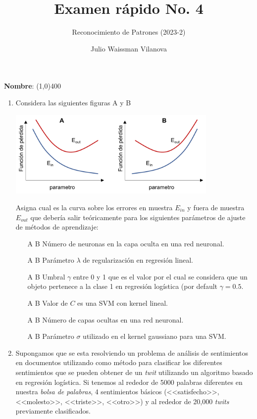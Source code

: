 \documentclass[11pt]{article}
\title{Examen rápido No. 4}
\author{Reconocimiento de Patrones (2023-2)}
\date{Julio Waissman Vilanova} %
\begin{document}
\maketitle

\vspace{5mm}

\textbf{Nombre}: \line(1,0){400}

\vspace{9mm}


\begin{enumerate}



\item Considera las siguientes figuras A y B

\begin{center}
  \includegraphics[width = 0.8\textwidth]{curvas.png}
\end{center}

Asigna cual es la curva sobre los errores en muestra $E_{in}$ y fuera de muestra
$E_{out}$ que debería salir teóricamente para los siguientes parámetros de
ajuste de métodos de aprendizaje:
\begin{itemize}
\item[ A B ] Número de neuronas en la capa oculta en una red neuronal.
\item[ A B ] Parámetro $\lambda$ de regularización en regresión lineal.
\item[ A B ] Umbral $\gamma$ entre 0 y 1 que es el valor por el cual se considera que un objeto pertenece a la clase 1 en regresión logística (por default $\gamma = 0.5$.
\item[ A B ] Valor de $C$ es una SVM con kernel lineal.
\item[ A B ] Número de capas ocultas en una red neuronal.
\item[ A B ] Parámetro $\sigma$ utilizado en el kernel gaussiano para una SVM.
\end{itemize}

\newpage


\item Supongamos que se esta resolviendo un problema de análisis de sentimientos
  en documentos utilizando como método para clasificar los diferentes
  sentimientos que se pueden obtener de un \emph{twit} utilizando un algoritmo
  basado en regresión logística. Si tenemos al rededor de 5000 palabras
  diferentes en nuestra \emph{bolsa de palabras}, 4 sentimientos básicos
  (<<satisfecho>>, <<molesto>>, <<triste>>, <<otro>>) y al rededor de 20,000
  \emph{twits} previamente clasificados.


\end{enumerate}
\end{document}
